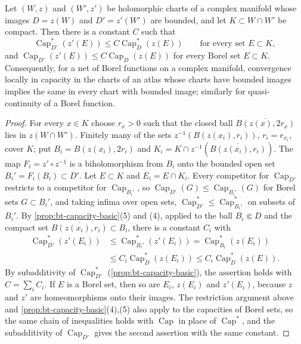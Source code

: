 \begin{lemma}\label{lem:capacity-chart-comparison}
Let $(W,z)$ and $(W',z')$ be holomorphic charts of a complex manifold whose images $D=z(W)$ and $D'=z'(W')$ are bounded, and let $K\subset W\cap W'$ be compact. Then there is a constant $C$ such that
\[
 \operatorname{Cap}_{D'}^*(z'(E))\leq C\operatorname{Cap}_D^*(z(E))\qquad\text{for every set }E\subset K,
\]
and $\operatorname{Cap}_{D'}(z'(E))\leq C\operatorname{Cap}_D(z(E))$ for every Borel set $E\subset K$. Consequently, for a net of Borel functions on a complex manifold, convergence locally in capacity in the charts of an atlas whose charts have bounded images implies the same in every chart with bounded image; similarly for quasi-continuity of a Borel function.
\end{lemma}
\begin{proof}
For every $x\in K$ choose $r_x>0$ such that the closed ball $\overline{B(z(x),2r_x)}$ lies in $z(W\cap W')$. Finitely many of the sets $z^{-1}(B(z(x_i),r_i))$, $r_i=r_{x_i}$, cover $K$; put $B_i=B(z(x_i),2r_i)$ and $K_i=K\cap z^{-1}(\overline{B(z(x_i),r_i)})$. The map $F_i=z'\circ z^{-1}$ is a biholomorphism from $B_i$ onto the bounded open set $B_i'=F_i(B_i)\subset D'$. Let $E\subset K$ and $E_i=E\cap K_i$. Every competitor for $\operatorname{Cap}_{D'}$ restricts to a competitor for $\operatorname{Cap}_{B_i'}$, so $\operatorname{Cap}_{D'}(G)\leq\operatorname{Cap}_{B_i'}(G)$ for Borel sets $G\subset B_i'$, and taking infima over open sets, $\operatorname{Cap}^*_{D'}\leq\operatorname{Cap}^*_{B_i'}$ on subsets of $B_i'$. By \cref{prop:bt-capacity-basic}(5) and (4), applied to the ball $B_i\Subset D$ and the compact set $\overline{B(z(x_i),r_i)}\subset B_i$, there is a constant $C_i$ with
\[
 \begin{aligned}
 \operatorname{Cap}^*_{D'}(z'(E_i))&\leq\operatorname{Cap}^*_{B_i'}(z'(E_i))=\operatorname{Cap}^*_{B_i}(z(E_i))\\
 &\leq C_i\operatorname{Cap}^*_D(z(E_i))\leq C_i\operatorname{Cap}^*_D(z(E)).
 \end{aligned}
\]
By subadditivity of $\operatorname{Cap}^*_{D'}$ (\cref{prop:bt-capacity-basic}), the assertion holds with $C=\sum_iC_i$. If $E$ is a Borel set, then so are $E_i$, $z(E_i)$ and $z'(E_i)$, because $z$ and $z'$ are homeomorphisms onto their images. The restriction argument above and \cref{prop:bt-capacity-basic}(4),(5) also apply to the capacities of Borel sets, so the same chain of inequalities holds with $\operatorname{Cap}$ in place of $\operatorname{Cap}^*$, and the subadditivity of $\operatorname{Cap}_{D'}$ gives the second assertion with the same constant.


\end{proof}
